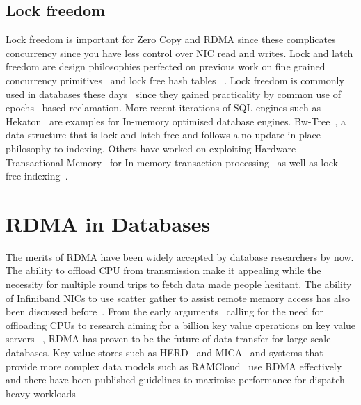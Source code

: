 \subsection{Lock freedom}
Lock freedom is important for Zero Copy and RDMA since these complicates concurrency since
you have less control over NIC read and writes. Lock and latch freedom are 
design philosophies perfected on previous work on fine grained concurrency 
primitives~\cite{finegrained} and lock free hash tables ~\cite{lockfreeht}. Lock freedom is commonly
used in databases these days~\cite{htm} since they gained practicality by common use of
epochs~\cite{lockfreedom} based reclamation. 
More recent iterations of SQL engines such as Hekaton~\cite{hekaton} are 
examples for In-memory optimised  database engines. Bw-Tree~\cite{bw-tree}, a 
data structure that is lock and latch free and follows a no-update-in-place philosophy to indexing.
Others have worked on exploiting Hardware Transactional Memory~\cite{htm-old}
for In-memory transaction processing~\cite{drtm} as well as lock free indexing~\cite{htm}.

\section{RDMA in Databases}
The merits of RDMA have been widely accepted by database researchers by now. The 
ability to offload CPU from transmission make it appealing while the necessity for 
multiple round trips to fetch data made people hesitant. The ability of Infiniband NICs to 
use scatter gather to assist remote memory access has also been discussed before~\cite{zerocopy04}.
From the early arguments~\cite{rdmacase} calling for the need for offloading CPUs to 
research aiming for a billion key value operations on key value servers ~\cite{rdmabillion},
RDMA has proven to be the future of data transfer for large scale databases. Key value stores
such as HERD~\cite{herd} and MICA~\cite{mica} and systems that provide more complex
data models such as RAMCloud~\cite{ramcloud} use RDMA effectively and there have been 
published guidelines to maximise performance for dispatch heavy workloads~\cite{rdma}


